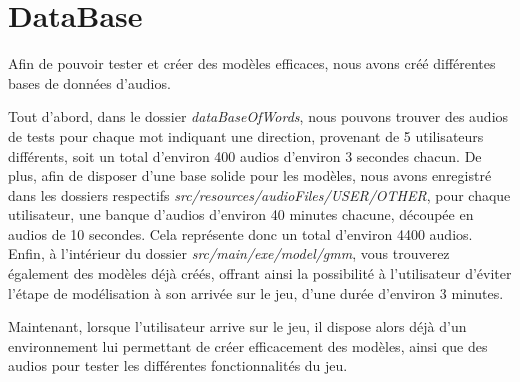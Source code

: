 \section{DataBase}
\label{sec:data_base}

Afin de pouvoir tester et créer des modèles efficaces, nous avons créé différentes bases de données d'audios.

Tout d'abord, dans le dossier \textit{dataBaseOfWords}, nous pouvons trouver des audios de tests pour chaque mot indiquant une direction, provenant de 5 utilisateurs différents, soit un total d'environ 400 audios d'environ 3 secondes chacun.
De plus, afin de disposer d'une base solide pour les modèles, nous avons enregistré dans les dossiers respectifs \textit{src/resources/audioFiles/USER/OTHER}, pour chaque utilisateur, une banque d'audios d'environ 40 minutes chacune, découpée en audios de 10 secondes.
Cela représente donc un total d'environ 4400 audios.
Enfin, à l'intérieur du dossier \textit{src/main/exe/model/gmm}, vous trouverez également des modèles déjà créés, offrant ainsi la possibilité à l'utilisateur d'éviter l'étape de modélisation à son arrivée sur le jeu, d'une durée d'environ 3 minutes.

Maintenant, lorsque l'utilisateur arrive sur le jeu, il dispose alors déjà d'un environnement lui permettant de créer efficacement des modèles, ainsi que des audios pour tester les différentes fonctionnalités du jeu.
